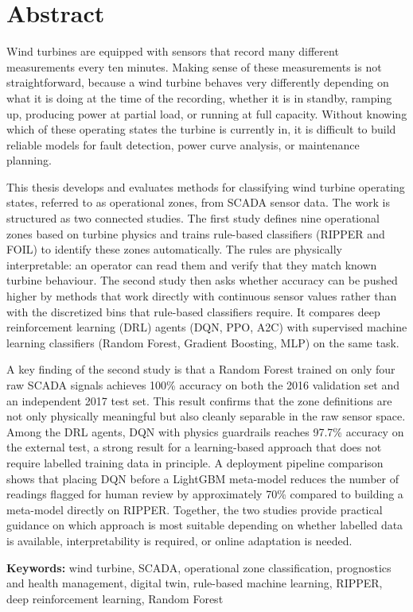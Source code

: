 \chapter*{Abstract}
\pagestyle{pre}

Wind turbines are equipped with sensors that record many different measurements every
ten minutes. Making sense of these measurements is not straightforward, because a wind
turbine behaves very differently depending on what it is doing at the time of the
recording, whether it is in standby, ramping up, producing power at partial load, or
running at full capacity. Without knowing which of these operating states the turbine
is currently in, it is difficult to build reliable models for fault detection, power
curve analysis, or maintenance planning.

This thesis develops and evaluates methods for classifying wind turbine operating
states, referred to as operational zones, from SCADA sensor data. The work is structured
as two connected studies. The first study defines nine operational zones based on turbine
physics and trains rule-based classifiers (RIPPER and FOIL) to identify these zones
automatically. The rules are physically interpretable: an operator can read them and
verify that they match known turbine behaviour. The second study then asks whether
accuracy can be pushed higher by methods that work directly with continuous sensor
values rather than with the discretized bins that rule-based classifiers require. It
compares deep reinforcement learning (DRL) agents (DQN, PPO, A2C) with supervised
machine learning classifiers (Random Forest, Gradient Boosting, MLP) on the same task.

A key finding of the second study is that a Random Forest trained on only four raw SCADA
signals achieves 100\% accuracy on both the 2016 validation set and an independent 2017
test set. This result confirms that the zone definitions are not only physically
meaningful but also cleanly separable in the raw sensor space. Among the DRL agents,
DQN with physics guardrails reaches 97.7\% accuracy on the external test, a strong
result for a learning-based approach that does not require labelled training data in
principle. A deployment pipeline comparison shows that placing DQN before a LightGBM
meta-model reduces the number of readings flagged for human review by approximately
70\% compared to building a meta-model directly on RIPPER. Together, the two studies
provide practical guidance on which approach is most suitable depending on whether
labelled data is available, interpretability is required, or online adaptation is needed.

\bigskip
\noindent\textbf{Keywords:} wind turbine, SCADA, operational zone classification,
prognostics and health management, digital twin, rule-based machine learning, RIPPER,
deep reinforcement learning, Random Forest
